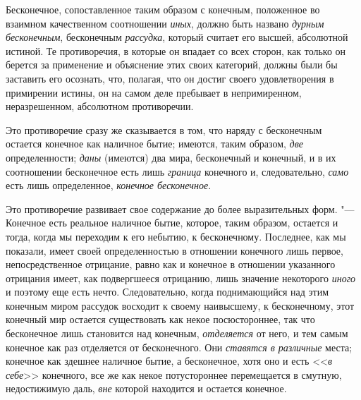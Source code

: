Бесконечное, сопоставленное таким образом с конечным, положенное во взаимном
качественном соотношении {\em иных}, должно быть
названо {\em дурным бесконечным}, бесконечным
{\em рассудка}, который считает его высшей, абсолютной
истиной. Те противоречия, в которые он впадает со всех сторон, как только
он берется за применение и объяснение этих своих категорий, должны были бы
заставить его осознать, что, полагая, что он достиг своего удовлетворения в
примирении истины, он на самом деле пребывает в непримиренном,
неразрешенном, абсолютном противоречии.

Это противоречие сразу же сказывается в том, что наряду с бесконечным
остается конечное как наличное бытие; имеются, таким образом,
{\em две} определенности;
{\em даны} (имеются) два мира, бесконечный и конечный,
и в их соотношении бесконечное есть лишь {\em граница}
конечного и, следовательно, {\em само} есть лишь
определенное, {\em конечное бесконечное}.

Это противоречие развивает свое содержание до более выразительных форм. "---
Конечное есть реальное наличное бытие, которое, таким образом, остается и
тогда, когда мы переходим к его небытию, к бесконечному. Последнее, как мы
показали, имеет своей определенностью в отношении конечного лишь первое,
непосредственное отрицание, равно как и конечное в отношении указанного
отрицания имеет, как подвергшееся отрицанию, лишь значение некоторого
{\em иного} и поэтому еще есть нечто. Следовательно,
когда поднимающийся над этим конечным миром рассудок восходит к своему
наивысшему, к бесконечному, этот конечный мир остается существовать как
некое посюстороннее, так что бесконечное лишь становится над конечным,
{\em отделяется} от него, и тем самым конечное как раз
отделяется от бесконечного. Они {\em ставятся в
различные} места; конечное как здешнее наличное бытие, а бесконечное, хотя
оно и есть <<{\em в себе}>> конечного, все же как некое
потустороннее перемещается в смутную, недостижимую даль,
{\em вне} которой находится и остается конечное.

